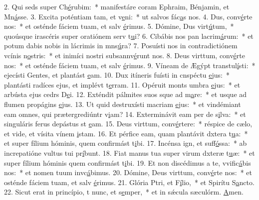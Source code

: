 2. Qui seds super Ch\uline{é}rubim:~* manifestáre coram Ephraim, Bénjamin, et Mn\uline{á}sse.
3. Excita poténtiam tam, et v\uline{e}ni:~* ut salvos fác\uline{a}s nos.
4. Dus, conv\uline{é}rte nos:~* et osténde fáciem tuam, et salv \uline{é}rimus.
5. Dómine, Dus virt\uline{ú}tum,~* quoúsque irascéris super oratiónem serv t\uline{u}i?
6. Cibábis nos pan lacrim\uline{á}rum:~* et potum dabis nobis in lácrimis in mns\uline{ú}ra?
7. Posuísti nos in contradictiónem vcínis n\uline{o}stris:~* et inimíci nostri subsannv\uline{é}runt nos.
8. Deus virttum, conv\uline{é}rte nos:~* et osténde fáciem tuam, et salv \uline{é}rimus.
9. Víneam de Ægýpt transtul\uline{í}sti:~* ejecísti Gentes, et plantást \uline{e}am.
10. Dux itíneris fuísti in cnspéctu \uline{e}jus:~* plantásti radíces ejus, et implévt t\uline{e}rram.
11. Opéruit monts umbra \uline{e}jus:~* et arbústa ejus cedrs D\uline{e}i.
12. Exténdit pálmites suos sque ad m\uline{a}re:~* et usque ad flumen propágins \uline{e}jus.
13. Ut quid destruxísti macriam \uline{e}jus:~* et vindémiant eam omnes, qui prætergrediúntr v\uline{i}am?
14. Exterminávit eam per de s\uline{i}lva:~* et singuláris ferus depástus st \uline{e}am.
15. Deus virttum, conv\uline{é}rtere:~* réspice de cælo, et vide, et vísita vínem \uline{i}stam.
16. Et pérfice eam, quam plantávit dxtera t\uline{u}a:~* et super fílium hóminis, quem confirmást t\uline{i}bi.
17. Incénsa ign, et suff\uline{ó}ssa:~* ab increpatióne vultus tui pr\uline{í}bunt.
18. Fiat manus tua super virum dxteræ t\uline{u}æ:~* et super fílium hóminis quem confirmást t\uline{i}bi.
19. Et non discédimus a te, vvific\uline{á}bis nos:~* et nomen tuum invc\uline{á}bimus.
20. Dómine, Deus virttum, conv\uline{é}rte nos:~* et osténde fáciem tuam, et salv \uline{é}rimus.
21. Glória Ptri, et F\uline{í}lio,~* et Spirítu S\uline{a}ncto.
22. Sicut erat in princípio, t nunc, et s\uline{e}mper,~* et in sǽcula sæculórm. \uline{A}men.
